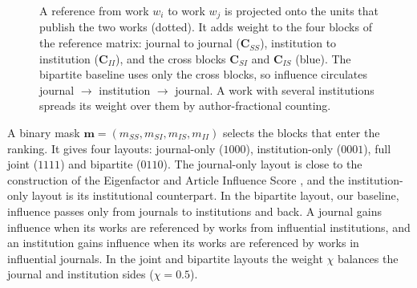 \begin{figure}[!htb]
  \centering
  \caption{A reference from work $w_i$ to work $w_j$ is projected onto the units that publish the two works (dotted). It adds weight to the four blocks of the reference matrix: journal to journal ($\mathbf{C}_{SS}$), institution to institution ($\mathbf{C}_{II}$), and the cross blocks $\mathbf{C}_{SI}$ and $\mathbf{C}_{IS}$ (blue). The bipartite baseline uses only the cross blocks, so influence circulates journal $\to$ institution $\to$ journal. A work with several institutions spreads its weight over them by author-fractional counting.}
  \label{fig:schematic}
\end{figure}

A binary mask $\mathbf{m}=(m_{SS},m_{SI},m_{IS},m_{II})$ selects the blocks that enter the ranking. It gives four layouts: journal-only ($1000$), institution-only ($0001$), full joint ($1111$) and bipartite ($0110$). The journal-only layout is close to the construction of the Eigenfactor and Article Influence Score \citep{bergstromEigenfactorMetrics2008}, and the institution-only layout is its institutional counterpart. In the bipartite layout, our baseline, influence passes only from journals to institutions and back. A journal gains influence when its works are referenced by works from influential institutions, and an institution gains influence when its works are referenced by works in influential journals. In the joint and bipartite layouts the weight $\chi$ balances the journal and institution sides ($\chi=0.5$).


